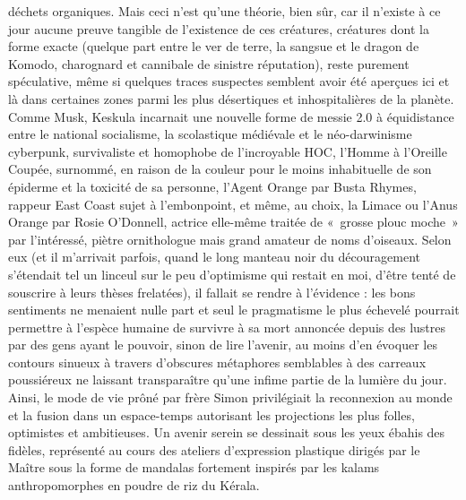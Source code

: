 déchets organiques. Mais ceci n’est qu’une théorie, bien sûr, car il n’existe à ce jour aucune preuve tangible de l’existence de ces créatures, créatures dont la forme exacte (quelque part entre le ver de terre, la sangsue et le dragon de Komodo, charognard et cannibale de sinistre réputation), reste purement spéculative, même si quelques traces suspectes semblent avoir été aperçues ici et là dans certaines zones parmi les plus désertiques et inhospitalières de la planète. Comme Musk, Keskula incarnait une nouvelle forme de messie 2.0 à équidistance entre le national socialisme, la scolastique médiévale et le néo-darwinisme cyberpunk, survivaliste et homophobe de l’incroyable HOC, l’Homme à l’Oreille Coupée, surnommé, en raison de la couleur pour le moins inhabituelle de son épiderme et la toxicité de sa personne, l’Agent Orange par Busta Rhymes, rappeur East Coast sujet à l’embonpoint, et même, au choix, la Limace ou l’Anus Orange par Rosie O’Donnell, actrice elle-même traitée de «~grosse plouc moche~» par l’intéressé, piètre ornithologue mais grand amateur de noms d’oiseaux. Selon eux (et il m’arrivait parfois, quand le long manteau noir du découragement s’étendait tel un linceul sur le peu d’optimisme qui restait en moi, d’être tenté de souscrire à leurs thèses frelatées), il fallait se rendre à l’évidence : les bons sentiments ne menaient nulle part et seul le pragmatisme le plus échevelé pourrait permettre à l’espèce humaine de survivre à sa mort annoncée depuis des lustres par des gens ayant le pouvoir, sinon de lire l’avenir, au moins d’en évoquer les contours sinueux à travers d’obscures métaphores semblables à des carreaux poussiéreux ne laissant transparaître qu’une infime partie de la lumière du jour. Ainsi, le mode de vie prôné par frère Simon privilégiait la reconnexion au monde et la fusion dans un espace-temps autorisant les projections les plus folles, optimistes et ambitieuses. Un avenir serein se dessinait sous les yeux ébahis des fidèles, représenté au cours des ateliers d’expression plastique dirigés par le Maître sous la forme de mandalas fortement inspirés par les kalams anthropomorphes en poudre de riz du Kérala.

